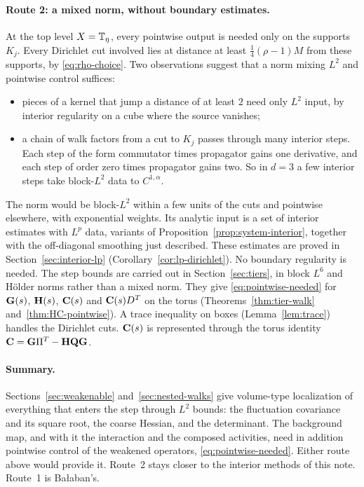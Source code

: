 \paragraph{Route 2: a mixed norm, without boundary estimates.} At the top level $X=\mathbb T_\eta$, every pointwise output is needed only on the supports $K_j$. Every Dirichlet cut involved lies at distance at least $\frac14(\rho-1)M$ from these supports, by \eqref{eq:rho-choice}. Two observations suggest that a norm mixing $L^2$ and pointwise control suffices:
\begin{itemize}
\item pieces of a kernel that jump a distance of at least $2$ need only $L^2$ input, by interior regularity on a cube where the source vanishes;
\item a chain of walk factors from a cut to $K_j$ passes through many interior steps. Each step of the form commutator times propagator gains one derivative, and each step of order zero times propagator gains two. So in $d=3$ a few interior steps take block-$L^2$ data to $C^{1,\alpha}$.
\end{itemize}
The norm would be block-$L^2$ within a few units of the cuts and pointwise elsewhere, with exponential weights. Its analytic input is a set of interior estimates with $L^p$ data, variants of Proposition~\ref{prop:system-interior}, together with the off-diagonal smoothing just described. These estimates are proved in Section~\ref{sec:interior-lp} (Corollary~\ref{cor:lp-dirichlet}). No boundary regularity is needed. The step bounds are carried out in Section~\ref{sec:tiers}, in block $L^6$ and H\"older norms rather than a mixed norm. They give \eqref{eq:pointwise-needed} for $\mathbf G(s)$, $\mathbf H(s)$, $\mathbf C(s)$ and $\mathbf C(s)D^T$ on the torus (Theorems~\ref{thm:tier-walk} and~\ref{thm:HC-pointwise}). A trace inequality on boxes (Lemma~\ref{lem:trace}) handles the Dirichlet cuts. $\mathbf C(s)$ is represented through the torus identity $\mathbf C=\mathbf G\Pi^T-\mathbf H\mathbf Q\mathbf G$.

\paragraph{Summary.} Sections~\ref{sec:weakenable} and~\ref{sec:nested-walks} give volume-type localization of everything that enters the step through $L^2$ bounds: the fluctuation covariance and its square root, the coarse Hessian, and the determinant. The background map, and with it the interaction and the composed activities, need in addition pointwise control of the weakened operators, \eqref{eq:pointwise-needed}. Either route above would provide it. Route~2 stays closer to the interior methods of this note. Route~1 is Ba\l aban's.
